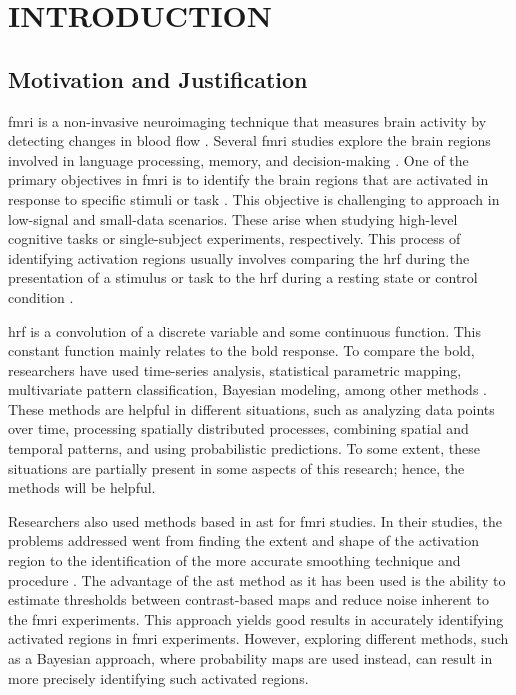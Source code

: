 \chapter{INTRODUCTION}

\section{Motivation and Justification}

\gls{fmri} is a non-invasive neuroimaging technique that measures brain 
activity by detecting changes in blood flow \cite{buchbinder2016functional, 
logothetis2008we, christopher2008applications}. Several \gls{fmri} studies 
explore the brain regions involved in language processing, memory, and 
decision-making \cite{gaillard2003developmental,golby2005memory,heekeren2003fmri}. 
One of the primary objectives in \gls{fmri} is to identify the brain regions 
that are activated in response to specific stimuli or 
task \cite{orchard2003simultaneous, deneux2006using, ardekani1999activation}. 
This objective is challenging to approach in low-signal and small-data scenarios. 
These arise when studying high-level cognitive tasks or single-subject 
experiments, respectively. This process of identifying activation regions 
usually involves comparing the \gls{hrf} during the presentation of a 
stimulus or task to the \gls{hrf} during a resting state or control 
condition \cite{arthurs2002well, logothetis2004nature, lee2013resting}.

\gls{hrf} is a convolution of a discrete variable and some continuous 
function. This constant function mainly relates to the \gls{bold} response. 
To compare the \gls{bold}, researchers have used time-series analysis, 
statistical parametric mapping, multivariate pattern classification, 
Bayesian modeling, among other methods 
\cite{adrian2018complex, marchini2004comparing, mumford2012deconvolving, makni2008fully}. 
These methods are helpful in different situations, such as analyzing data 
points over time, processing spatially distributed processes, combining 
spatial and temporal patterns, and using probabilistic predictions. 
To some extent, these situations are partially present in some aspects 
of this research; hence, the methods will be helpful.

Researchers also used methods based in \gls{ast} for \gls{fmri} studies. 
In their studies, the problems addressed went from finding the extent and 
shape of the activation region to the identification of the more accurate 
smoothing technique and procedure 
\cite{tabelow2006analyzing, lindquist2010adaptive, strappini2017adaptive,almodovar2019fast}. 
The advantage of the \gls{ast} method as it has been used is the ability to 
estimate thresholds between contrast-based maps and reduce noise inherent to 
the \gls{fmri} experiments. This approach yields good results in accurately 
identifying activated regions in \gls{fmri} experiments. However, exploring 
different methods, such as a Bayesian approach, where probability maps are 
used instead, can result in more precisely identifying such activated regions.


